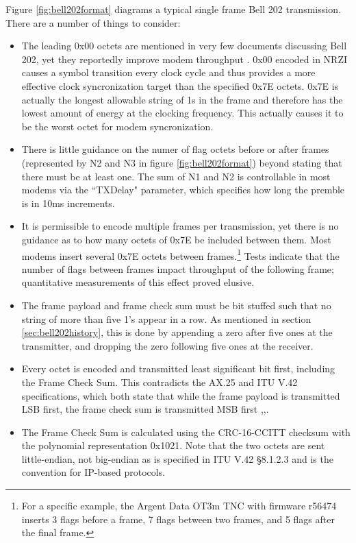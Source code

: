 Figure \ref{fig:bell202format} diagrams a typical single frame
Bell 202 transmission. There are a number of things to
consider:
\begin{itemize}
	\item The leading 0x00 octets are mentioned in very few documents
		discussing Bell 202, yet they reportedly improve modem
		throughput \cite{millerinterview}. 
		0x00 encoded in NRZI causes a symbol transition
		every clock cycle and thus provides a more effective clock 
		syncronization target than the specified 0x7E octets. 0x7E is actually 
		the longest allowable string of 1s in the frame and 
		therefore has the lowest amount of energy at the clocking frequency.
		This actually causes it to be the worst 
		octet for modem syncronization.
	\item There is little guidance on the numer of flag octets before
		or after frames (represented by N2 and N3 in 
		figure \ref{fig:bell202format})
		beyond stating that there must be at least one. The sum of
		N1 and N2 is controllable in most modems via the ``TXDelay" parameter,
		which specifies how long the premble is in 10ms increments.
	\item It is permissible to encode multiple 
		frames per transmission, yet there is no guidance as to how
		many octets of 0x7E be included between them.
		Most modems insert several 0x7E octets between 
		frames.\footnote{For a specific example, the Argent Data OT3m TNC 
			with firmware r56474 inserts 3 flags before
		a frame, 7 flags between two frames, and 5 flags after the final frame.}
		Tests indicate that the number of flags between frames 
		impact throughput of the following frame;
		quantitative measurements of this effect proved elusive.
	\item The frame payload and frame check sum must be bit stuffed such 
		that no string of more than five 1's appear in a row.
		As mentioned in section \ref{sec:bell202history}, this is 
		done by appending a zero after five ones at the transmitter,
		and dropping the zero following five ones at the receiver.
	\item Every octet is encoded and transmitted least significant bit first,
		including the Frame Check Sum.
		This contradicts the AX.25 and ITU V.42 specifications, 
		which both state
		that while the frame payload is transmitted LSB first, the frame
		check sum is transmitted MSB first 
		\cite[\S3.8]{ax25spec},\cite{n1vgphy},\cite[\S8.1.2.2-3]{ituv42}.
	\item The Frame Check Sum is calculated using the CRC-16-CCITT checksum
		with the polynomial representation 0x1021. 
		Note that the two octets are sent little-endian, not
		big-endian as is specified in ITU V.42 \S8.1.2.3 and is the
		convention for IP-based protocols.

\end{itemize}

